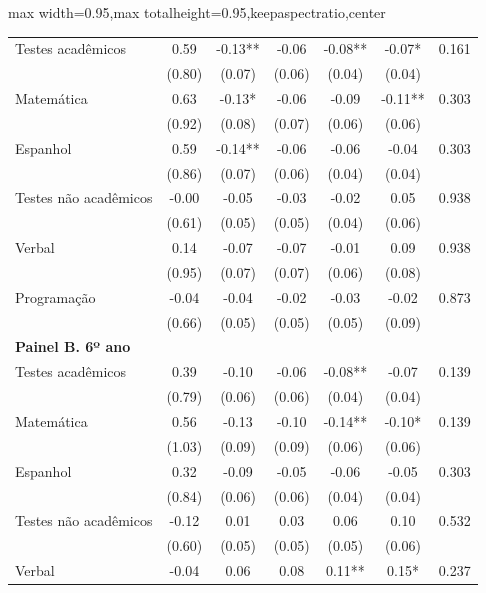 \documentclass[12pt,letterpaper]{article}
\newcommand{\1}{\mathbbm{1}}
\numberwithin{equation}{section}
\begin{document}
\begin{table}[!htb]
\begin{adjustbox}{max width=0.95\textwidth,max totalheight=0.95\textheight,keepaspectratio,center}
\begin{tabular}{lcccccc}
\hspace{2mm} Testes acadêmicos & 0.59 & -0.13** & -0.06 & -0.08** & -0.07* & 0.161 \\
& (0.80) & (0.07) & (0.06) & (0.04) & (0.04) & \\
\hspace{2mm} Matemática & 0.63 & -0.13* & -0.06 & -0.09 & -0.11** & 0.303 \\
& (0.92) & (0.08) & (0.07) & (0.06) & (0.06) & \\
\hspace{2mm} Espanhol & 0.59 & -0.14** & -0.06 & -0.06 & -0.04 & 0.303 \\
&(0.86) & (0.07) & (0.06) & (0.04) & (0.04) & \\
\hspace{2mm} Testes não acadêmicos & -0.00 & -0.05 & -0.03 & -0.02 & 0.05 & 0.938 \\
&(0.61) & (0.05) & (0.05) & (0.04) & (0.06) & \\
\hspace{2mm} Verbal & 0.14 & -0.07 & -0.07 & -0.01 & 0.09 & 0.938 \\
&(0.95) & (0.07) & (0.07) & (0.06) & (0.08) & \\
\hspace{2mm} Programação & -0.04 & -0.04 & -0.02 & -0.03 & -0.02 & 0.873 \\
&(0.66) & (0.05) & (0.05) & (0.05) & (0.09) & \\
\textbf{Painel B. 6º ano} &  &  &  &  &  \\
\hspace{2mm} Testes acadêmicos & 0.39 & -0.10 & -0.06 & -0.08** & -0.07 &  0.139 \\
& (0.79) & (0.06) & (0.06) & (0.04) & (0.04) \\
\hspace{2mm} Matemática & 0.56 & -0.13 & -0.10 & -0.14** & -0.10* & 0.139 \\
& (1.03)  & (0.09) & (0.09) & (0.06) & (0.06) \\
\hspace{2mm} Espanhol & 0.32 & -0.09 & -0.05 & -0.06 & -0.05 & 0.303 \\
& (0.84) & (0.06) & (0.06) & (0.04) & (0.04) \\
\hspace{2mm} Testes não acadêmicos & -0.12 & 0.01 & 0.03 & 0.06 & 0.10 & 0.532 \\
& (0.60) & (0.05) & (0.05) & (0.05) & (0.06) \\
\hspace{2mm} Verbal & -0.04 & 0.06 & 0.08 & 0.11** & 0.15* & 0.237 \\

\end{tabular}
\end{adjustbox}
\end{table}
\end{document}
